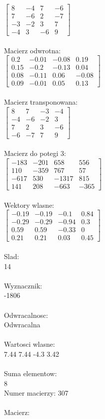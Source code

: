 \documentclass[a4paper,12pt]{article}
\begin{document}
$\begin{bmatrix} 8&-4&7&-6\\7&-6&2&-7\\-3&-2&3&7\\-4&3&-6&9 \end{bmatrix}$
\\
\\
Macierz odwrotna:\\

$\begin{bmatrix} 0.2&-0.01&-0.08&0.19\\0.15&-0.2&-0.13&0.04\\0.08&-0.11&0.06&-0.08\\0.09&-0.01&0.05&0.13 \end{bmatrix}$
\\
\\
Macierz transponowana:\\

$\begin{bmatrix} 8&7&-3&-4\\-4&-6&-2&3\\7&2&3&-6\\-6&-7&7&9 \end{bmatrix}$
\\
\\
Macierz do potegi 3:\\

$\begin{bmatrix} -183&-201&658&556\\110&-359&767&57\\-617&530&-1317&815\\141&208&-663&-365 \end{bmatrix}$
\\
\\
Wektory wlasne:\\

$\begin{bmatrix} -0.19&-0.19&-0.1&0.84\\-0.29&-0.29&-0.94&0.3\\0.59&0.59&-0.33&0\\0.21&0.21&0.03&0.45 \end{bmatrix}$
\\
\\
Slad:\\
14
\\
\\
Wyznacznik:\\
-1806
\\
\\
Odwracalnosc:\\
Odwracalna
\\
\\
Wartosci wlasne:\\
7.44 7.44 -4.3 3.42
\\
\\
Suma elementow:\\
8
\\
\newpage
Numer macierzy:
307
\\
\\
Macierz:\\
\end{document}
